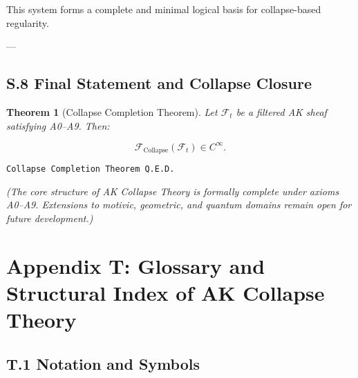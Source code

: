 \documentclass[11pt]{article}
\newtheorem{theorem}{Theorem}[section]
\begin{document}
{This system forms a complete and minimal logical basis for collapse-based regularity.

---

\subsection*{S.8 Final Statement and Collapse Closure}

\begin{theorem}[Collapse Completion Theorem]
Let $\mathcal{F}_t$ be a filtered AK sheaf satisfying A0–A9. Then:

\[
\mathcal{F}_{\mathrm{Collapse}}(\mathcal{F}_t) \in C^\infty.
\]
\end{theorem}

\begin{flushright}
\texttt{\large Collapse Completion Theorem \quad Q.E.D.}
\end{flushright}

\begin{center}
\small
\textit{(The core structure of AK Collapse Theory is formally complete under axioms A0–A9.  
Extensions to motivic, geometric, and quantum domains remain open for future development.)}
\end{center}




\section*{Appendix T: Glossary and Structural Index of AK Collapse Theory}

\subsection*{T.1 Notation and Symbols}

}
\end{document}
